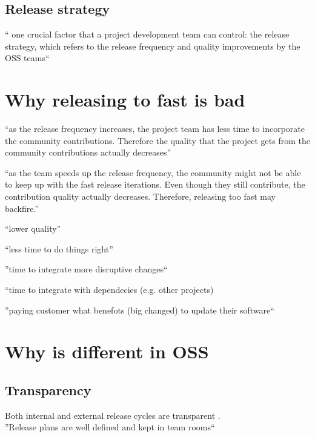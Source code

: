  
    \subsection{Release strategy }
    
    
   `` one  crucial  factor  that  a  project  development  team  can  control:  the  release  strategy,  which refers  to  the  release  frequency  and  quality  improvements  by  the  OSS  teams`` \citep{ChenKrishnan_et_al2013}
 
 
 \section{Why releasing to fast is bad}
 
 
 
``as the release frequency  increases,  the  project  team  has  less  time to  incorporate  the  community  contributions. 
Therefore the quality that the project gets from the community contributions actually decreases'' \citep{ChenKrishnan_et_al2013}

``as  the  team  speeds  up  the  release  frequency,  the  community 
might  not  be  able  to  keep  up  with  the  fast  release 
iterations.  Even  though  they  still  contribute,  the 
contribution quality actually decreases. Therefore, releasing too fast may backfire.'' \citep{ChenKrishnan_et_al2013}

``lower quality'' 

``less time to do things right'' 

''time to integrate more disruptive changes`` 

``time to integrate with dependecies (e.g. other projects)
 
 ''paying customer what benefots (big changed) to update their software`` 
 
 \section{Why is different in OSS}
 
 
 
 \subsection{Transparency }
 
 Both internal and external release cycles are transparent \citep{KakolaKoivulahtiOjala_et_al2010}. \\ 
 
 ''Release plans are well defined and kept in team rooms`` \citep{VitharanaKing_et_al2010}
 
